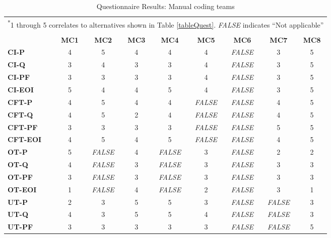 \documentclass[final_report_innit.tex]{subfiles}
\begin{document}
\begin{table}[h]
\centering
\caption{Questionnaire Results: Manual coding teams}
\begin{tabular}[b]{l | c | c | c | c | c | c | c | c}
	\multicolumn{9}{c}{\textsuperscript{*}\footnotesize{\cellcolor{greyEven}1 through 5 correlates to alternatives shown in Table \ref{tableQuest}. \textit{FALSE} indicates ``Not applicable''}} \\
	\multicolumn{9}{c}{\cellcolor{greyEven}} \\
	& \textbf{MC1} & \textbf{MC2} & \textbf{MC3} & \textbf{MC4} & \textbf{MC5} & \textbf{MC6} & \textbf{MC7} & \textbf{MC8} \\ %
	\textbf{CI-P} & 4 & 5 & 4 & 4 & 4 & \textit{FALSE} & 3 & 5 \\ %
	\textbf{CI-Q} & 3 & 4 & 3 & 3 & 4 & \textit{FALSE} & 3 & 5 \\ %
	\textbf{CI-PF} & 3 & 3 & 3 & 3 & 4 & \textit{FALSE} & 3 & 5 \\ %
	\textbf{CI-EOI} & 5 & 4 & 4 & 5 & 4 & \textit{FALSE} & 3 & 5 \\ %
	\textbf{CFT-P} & 4 & 5 & 4 & 4 & \textit{FALSE} & \textit{FALSE} & 4 & 5 \\ %
	\textbf{CFT-Q} & 4 & 5 & 2 & 4 & \textit{FALSE} & \textit{FALSE} & 4 & 5 \\ %
	\textbf{CFT-PF} & 3 & 3 & 3 & 3 & \textit{FALSE} & \textit{FALSE} & 5 & 5 \\ %
	\textbf{CFT-EOI} & 4 & 5 & 4 & 5 & \textit{FALSE} & \textit{FALSE} & 4 & 5 \\ %
	\textbf{OT-P} & 5 & \textit{FALSE} & 4 & \textit{FALSE} & 3 & \textit{FALSE} & 2 & 2 \\ %
	\textbf{OT-Q} & 4 & \textit{FALSE} & 3 & \textit{FALSE} & 3 & \textit{FALSE} & 3 & 3 \\ %
	\textbf{OT-PF} & 3 & \textit{FALSE} & 3 & \textit{FALSE} & 3 & \textit{FALSE} & 3 & 3 \\ %
	\textbf{OT-EOI} & 1 & \textit{FALSE} & 4 & \textit{FALSE} & 2 & \textit{FALSE} & 3 & 1 \\ %
	\textbf{UT-P} & 2 & 3 & 5 & 5 & 3 & \textit{FALSE} & \textit{FALSE} & 3 \\ %
	\textbf{UT-Q} & 4 & 3 & 5 & 5 & 4 & \textit{FALSE} & \textit{FALSE} & 3 \\ %
	\textbf{UT-PF} & 3 & 3 & 3 & 3 & 3 & \textit{FALSE} & \textit{FALSE} & 5 \\ %

\end{tabular}
\end{table}
\end{document}
